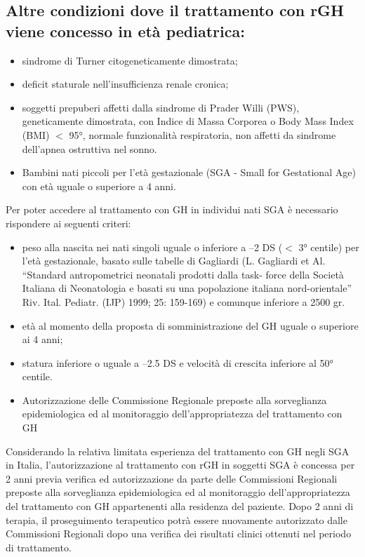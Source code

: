 \subsection*{Altre condizioni dove il trattamento con rGH viene concesso in et\`a pediatrica:}

\begin{itemize}
\item sindrome di Turner citogeneticamente dimostrata;
\item deficit staturale nell'insufficienza renale cronica;
\item soggetti prepuberi affetti dalla sindrome di Prader Willi (PWS), geneticamente dimostrata, con Indice di Massa Corporea o Body Mass
Index (BMI) $<$ 95°, normale funzionalit\`a respiratoria, non affetti da sindrome dell'apnea ostruttiva nel
sonno.
\item Bambini nati piccoli per l'et\`a gestazionale (SGA - Small for Gestational Age) con et\`a uguale o superiore a
4 anni.
\end{itemize}

Per poter accedere al trattamento con GH in individui nati SGA \`e necessario rispondere ai seguenti criteri:
\begin{itemize}
\item peso alla nascita nei nati singoli uguale o inferiore a –2 DS ($<$ 3° centile) per l'et\`a gestazionale, basato
sulle tabelle di Gagliardi (L. Gagliardi et Al. “Standard antropometrici neonatali prodotti dalla task-
force della Societ\`a Italiana di Neonatologia e basati su una popolazione italiana nord-orientale” Riv.
Ital. Pediatr. (IJP) 1999; 25: 159-169) e comunque inferiore a 2500 gr.
\item et\`a al momento della proposta di somministrazione del GH uguale o superiore ai 4 anni;
\item statura inferiore o uguale a –2.5 DS e velocit\`a di crescita inferiore al 50° centile.
\item Autorizzazione delle Commissione Regionale preposte alla sorveglianza epidemiologica ed al
monitoraggio dell'appropriatezza del trattamento con GH
\end{itemize}

Considerando la relativa limitata esperienza del trattamento con GH negli SGA in Italia, l'autorizzazione al
trattamento con rGH in soggetti SGA \`e concessa per 2 anni previa verifica ed autorizzazione da parte delle
Commissioni Regionali preposte alla sorveglianza epidemiologica ed al monitoraggio dell'appropriatezza del
trattamento con GH appartenenti alla residenza del paziente. Dopo 2 anni di terapia, il proseguimento
terapeutico potr\`a essere nuovamente autorizzato dalle Commissioni Regionali dopo una verifica dei risultati
clinici ottenuti nel periodo di trattamento.

